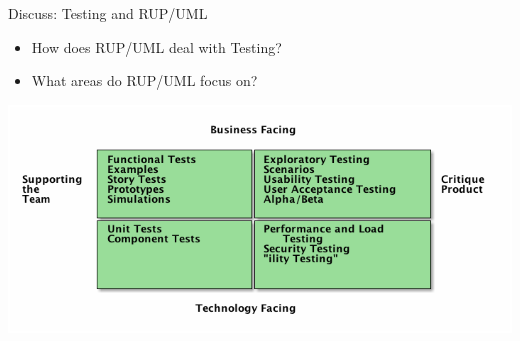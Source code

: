 \documentclass[10pt,t,a4paper]{beamer}
\begin{document}
\begin{frame}[label=sec-19]{Discuss: Testing and RUP/UML}
\begin{itemize}
\item How does RUP/UML deal with Testing?
\item What areas do RUP/UML focus on?
\end{itemize}

\includegraphics[width=.9\linewidth]{./FTestQuadrants0.png}
\end{frame}
\end{document}
